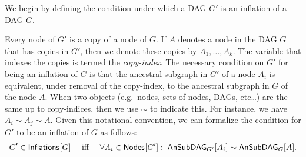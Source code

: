 
We begin by defining the condition under which a DAG $G'$  is an inflation of a DAG $G$.

Every node of $G'$ is a copy of a node of $G$. If $A$ denotes a node in the DAG $G$ that has copies in $G'$, then we denote these copies by $A_1,\ldots, A_k$.  The variable that indexes the copies is termed the {\em copy-index}.
The necessary condition on $G'$ for being an inflation of $G$ is that the ancestral subgraph in $G'$ of a node $A_i$ is equivalent, under removal of the copy-index, to the ancestral subgraph in $G$ of the node $A$.  
When two objects (e.g.~nodes, sets of nodes, DAGs, etc\ldots) are the same up to copy-indices, then we use $\sim$ to indicate this.  For instance, we have $A_i\sim A_j\sim A$.  Given this notational convention, we can formalize the condition for $G'$ to be an inflation of $G$ as follows:
\begin{align}\label{eq:definflationDAG}
G' \in\SmallNamedFunction{Inflations}{G} \quad\text{ iff }\quad \forall A_i\in \SmallNamedFunction{Nodes}{G'}:\; \ansubgraph[G']{A_i}\sim\ansubgraph[G]{A}.
\end{align}

